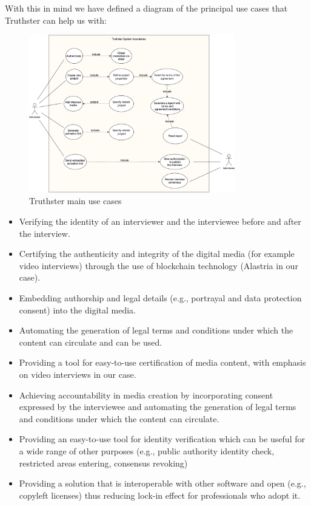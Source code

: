 \documentclass[target=mst,aauheader=]{thud}
\begin{document}
With this in mind we have defined a diagram of the principal use cases that Truthster can help us with:


\begin{figure}
    \centering
    \includegraphics[width=0.8\textwidth]{images/truthster_use_cases.png}
    \caption{Truthster main use cases}
\end{figure}





\begin{itemize}

    \item Verifying the identity of an interviewer and the interviewee before and after the interview.
    \item Certifying the authenticity and integrity of the digital media (for example video interviews) through the use of blockchain technology (Alastria in our case).
    \item Embedding authorship and legal details (e.g., portrayal and data protection consent) into the digital media.
    \item Automating the generation of legal terms and conditions under which the content can circulate and can be used.
    \item Providing a tool for easy-to-use certification of media content, with emphasis on video interviews in our case.
    \item Achieving accountability in media creation by incorporating consent expressed by the interviewee and automating the generation of legal terms and conditions under which the content can circulate.
    \item Providing an easy-to-use tool for identity verification which can be useful for a wide range of other purposes (e.g., public authority identity check, restricted areas entering, consensus revoking)
    \item Providing a solution that is interoperable with other software and open (e.g., copyleft licenses) thus reducing lock-in effect for professionals who adopt it.
    
\end{itemize}
\end{document}
